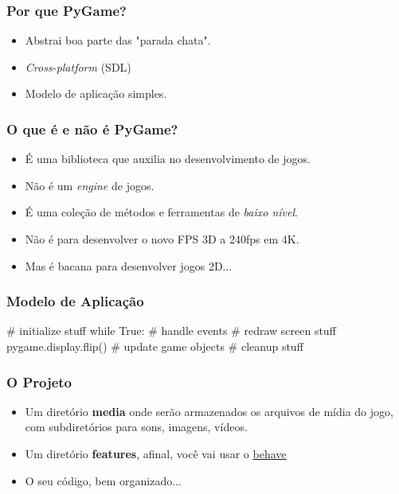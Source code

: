 \begin{frame}
    \frametitle{Por que PyGame?}

    \begin{itemize}
        \item Abstrai boa parte das "parada chata".
        \item \textit{Cross-platform} (SDL)
        \item Modelo de aplicação simples.
    \end{itemize}
\end{frame}

\begin{frame}
    \frametitle{O que é e não é PyGame?}

    \begin{itemize}
        \item É uma biblioteca que auxilia no desenvolvimento de jogos.
        \item Não é um \textit{engine} de jogos.
        \item É uma coleção de métodos e ferramentas de \textit{baixo nível}.
        \item Não é para desenvolver o novo FPS 3D a 240fps em 4K.
        \item Mas é bacana para desenvolver jogos 2D...
    \end{itemize}
\end{frame}

\begin{frame}[fragile]
    \frametitle{Modelo de Aplicação}

    \begin{python}
        # initialize stuff
        while True:
            # handle events
            # redraw screen stuff
            pygame.display.flip()
            # update game objects
        # cleanup stuff
    \end{python}
\end{frame}

\begin{frame}
    \frametitle{O Projeto}

    \begin{itemize}
        \item Um diretório \textbf{media} onde serão armazenados os arquivos de
        mídia do jogo, com subdiretórios para sons, imagens, vídeos.
        \item Um diretório \textbf{features}, afinal, você vai usar o
        {\color{blue}\underline{\href{https://github.com/behave}{behave}}}
        \item O seu código, bem organizado...
    \end{itemize}
\end{frame}

